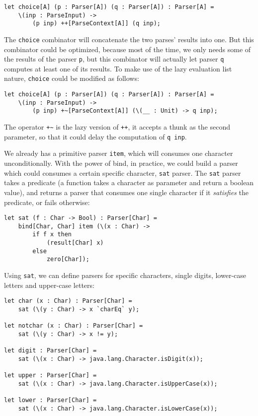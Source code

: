 \begin{lstlisting}
let choice[A] (p : Parser[A]) (q : Parser[A]) : Parser[A] =
    \(inp : ParseInput) ->
        (p inp) ++[ParseContext[A]] (q inp);
\end{lstlisting}

The \texttt{choice} combinator will concatenate the two parses' results into one. But this combinator could be optimized, because most of the time, we only needs some of the results of the parser \texttt{p}, but this combinator will actually let parser \texttt{q} computes at least one of its results. To make use of the lazy evaluation list nature, \texttt{choice} could be modified as follows:

\begin{lstlisting}
let choice[A] (p : Parser[A]) (q : Parser[A]) : Parser[A] =
    \(inp : ParseInput) ->
        (p inp) +~[ParseContext[A]] (\(__ : Unit) -> q inp);
\end{lstlisting}

The operator \texttt{+\textasciitilde{}} is the lazy version of \texttt{++}, it accepts a thunk as the second parameter, so that it could delay the computation of \texttt{q inp}.

We already has a primitive parser \texttt{item}, which will consumes one character unconditionally. With the power of bind, in practice, we could build a parser which could consumes a certain specific character, \texttt{sat} parser. The \texttt{sat} parser takes a predicate (a function takes a character as parameter and return a boolean value), and returns a parser that consumes one single character if it \textit{satisfies} the predicate, or fails otherwise:

\begin{lstlisting}
let sat (f : Char -> Bool) : Parser[Char] =
    bind[Char, Char] item (\(x : Char) ->
        if f x then
            (result[Char] x)
        else
            zero[Char]);
\end{lstlisting}

Using \texttt{sat}, we can define parsers for specific characters, single digits, lower-case letters and upper-case letters:

\begin{lstlisting}
let char (x : Char) : Parser[Char] =
    sat (\(y : Char) -> x `charEq` y);

let notchar (x : Char) : Parser[Char] =
    sat (\(y : Char) -> x != y);

let digit : Parser[Char] =
    sat (\(x : Char) -> java.lang.Character.isDigit(x));

let upper : Parser[Char] =
    sat (\(x : Char) -> java.lang.Character.isUpperCase(x));

let lower : Parser[Char] =
    sat (\(x : Char) -> java.lang.Character.isLowerCase(x));
\end{lstlisting}

